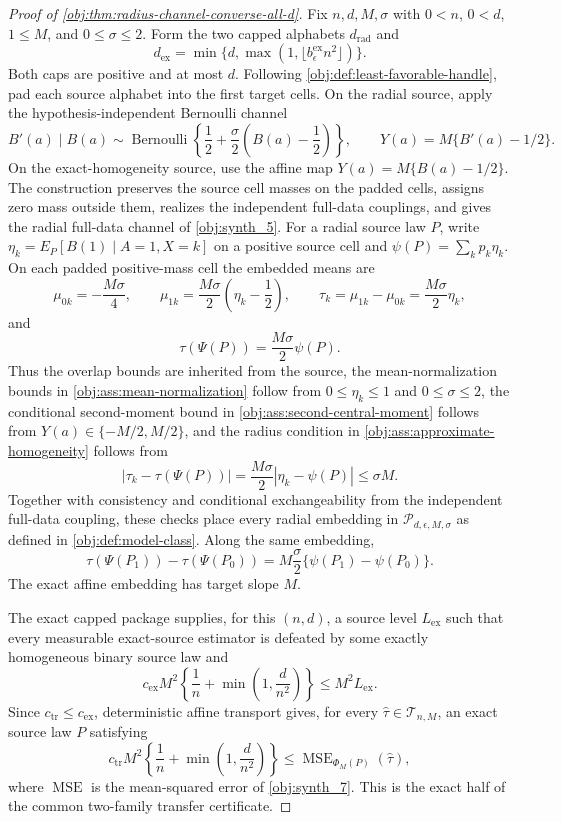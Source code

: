 \begin{proof}[Proof of \cref{obj:thm:radius-channel-converse-all-d}]
Fix \(n,d,M,\sigma\) with \(0<n\), \(0<d\), \(1\le M\), and \(0\le\sigma\le2\).  Form the two capped alphabets \(d_{\mathrm{rad}}\) and
\[
d_{\mathrm{ex}}
=
\min\{d,\max(1,\lfloor b_{\epsilon}^{\mathrm{ex}}n^2\rfloor)\}.
\]
Both caps are positive and at most \(d\).  Following \cref{obj:def:least-favorable-handle}, pad each source alphabet into the first target cells.  On the radial source, apply the hypothesis-independent Bernoulli channel
\[
B'(a)\mid B(a)
\sim
\operatorname{Bernoulli}\!\left\{\frac12+\frac{\sigma}{2}\left(B(a)-\frac12\right)\right\},
\qquad
Y(a)=M\{B'(a)-1/2\}.
\]
On the exact-homogeneity source, use the affine map \(Y(a)=M\{B(a)-1/2\}\).  The construction preserves the source cell masses on the padded cells, assigns zero mass outside them, realizes the independent full-data couplings, and gives the radial full-data channel of \cref{obj:synth_5}.  For a radial source law \(P\), write \(\eta_k=E_P[B(1)\mid A=1,X=k]\) on a positive source cell and \(\psi(P)=\sum_k p_k\eta_k\).  On each padded positive-mass cell the embedded means are
\[
\mu_{0k}=-\frac{M\sigma}{4},
\qquad
\mu_{1k}=\frac{M\sigma}{2}\left(\eta_k-\frac12\right),
\qquad
\tau_k=\mu_{1k}-\mu_{0k}=\frac{M\sigma}{2}\eta_k,
\]
and
\[
\tau(\Psi(P))=\frac{M\sigma}{2}\psi(P).
\]
Thus the overlap bounds are inherited from the source, the mean-normalization bounds in \cref{obj:ass:mean-normalization} follow from \(0\le\eta_k\le1\) and \(0\le\sigma\le2\), the conditional second-moment bound in \cref{obj:ass:second-central-moment} follows from \(Y(a)\in\{-M/2,M/2\}\), and the radius condition in \cref{obj:ass:approximate-homogeneity} follows from
\[
|\tau_k-\tau(\Psi(P))|
=
\frac{M\sigma}{2}|\eta_k-\psi(P)|
\le \sigma M .
\]
Together with consistency and conditional exchangeability from the independent full-data coupling, these checks place every radial embedding in \(\mathcal P_{d,\epsilon,M,\sigma}\) as defined in \cref{obj:def:model-class}.  Along the same embedding,
\[
\tau(\Psi(P_1))-\tau(\Psi(P_0))
=
M\frac{\sigma}{2}\{\psi(P_1)-\psi(P_0)\}.
\]
The exact affine embedding has target slope \(M\). %

The exact capped package supplies, for this \((n,d)\), a source level \(L_{\mathrm{ex}}\) such that every measurable exact-source estimator is defeated by some exactly homogeneous binary source law and
\[
c_{\mathrm{ex}}M^2
\left\{\frac1n+\min\left(1,\frac d{n^2}\right)\right\}
\le
M^2L_{\mathrm{ex}} .
\]
Since \(c_{\mathrm{tr}}\le c_{\mathrm{ex}}\), deterministic affine transport gives, for every \(\widehat\tau\in\mathcal T_{n,M}\), an exact source law \(P\) satisfying
\[
c_{\mathrm{tr}}M^2
\left\{\frac1n+\min\left(1,\frac d{n^2}\right)\right\}
\le
\operatorname{MSE}_{\Phi_M(P)}(\widehat\tau),
\]
where \(\operatorname{MSE}\) is the mean-squared error of \cref{obj:synth_7}.  This is the exact half of the common two-family transfer certificate. %


\end{proof}
